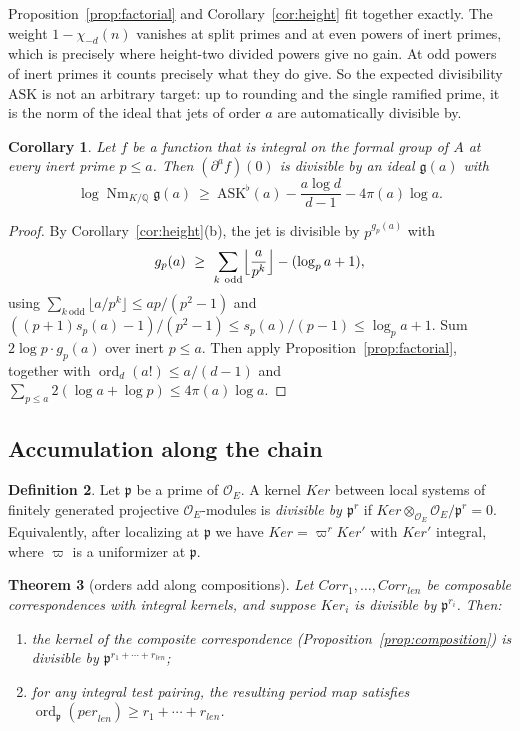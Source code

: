 \documentclass[11pt]{amsart}
\newtheorem{theorem}{Theorem}[section]
\newtheorem{corollary}[theorem]{Corollary}
\theoremstyle{definition}
\newtheorem{definition}[theorem]{Definition}
\theoremstyle{remark}
\newcommand{\OEring}{\mathcal{O}_E}
\newcommand{\per}{\mathit{per}}
\newcommand{\len}{\mathit{len}}
\newcommand{\Corr}{\mathit{Corr}}
\newcommand{\Ker}{\mathit{Ker}}
\DeclareMathOperator{\Nm}{Nm}
\DeclareMathOperator{\ord}{ord}
\newcommand{\Q}{\mathbb{Q}}
\newcommand{\pp}{\mathfrak{p}}
\newcommand{\ASK}{\mathrm{ASK}}
\begin{document}
Proposition~\ref{prop:factorial} and Corollary~\ref{cor:height} fit together exactly. The weight $1-\chi_{-d}(n)$ vanishes at split primes and at even powers of inert primes, which is precisely where height-two divided powers give no gain. At odd powers of inert primes it counts precisely what they do give. So the expected divisibility $\ASK$ is not an arbitrary target: up to rounding and the single ramified prime, it is the norm of the ideal that jets of order $a$ are automatically divisible by.

\begin{corollary}\label{cor:factorial-gain}
Let $f$ be a function that is integral on the formal group of $A$ at every inert prime $p\le a$. Then $(\partial^af)(0)$ is divisible by an ideal $\mathfrak g(a)$ with
\[
\log\Nm_{K/\Q}\mathfrak g(a)\ \ge\ \ASK^\flat(a)-\frac{a\log d}{d-1}-4\pi(a)\log a .
\]
\end{corollary}

\begin{proof}
By Corollary~\ref{cor:height}(b), the jet is divisible by $p^{g_p(a)}$ with
\[
g_p(a)\ \ge\ \sum_{k\ \mathrm{odd}}\Bigl\lfloor\frac a{p^k}\Bigr\rfloor-(\log_pa+1),
\]
using $\sum_{k\ \mathrm{odd}}\lfloor a/p^k\rfloor\le ap/(p^2-1)$ and $((p+1)s_p(a)-1)/(p^2-1)\le s_p(a)/(p-1)\le\log_pa+1$. Sum $2\log p\cdot g_p(a)$ over inert $p\le a$. Then apply Proposition~\ref{prop:factorial}, together with $\ord_d(a!)\le a/(d-1)$ and $\sum_{p\le a}2(\log a+\log p)\le4\pi(a)\log a$.
\end{proof}

\subsection{Accumulation along the chain}
\begin{definition}
Let $\pp$ be a prime of $\OEring$. A kernel $\Ker$ between local systems of finitely generated projective $\OEring$-modules is \emph{divisible by $\pp^r$} if $\Ker\otimes_{\OEring}\OEring/\pp^r=0$. Equivalently, after localizing at $\pp$ we have $\Ker=\varpi^r\Ker'$ with $\Ker'$ integral, where $\varpi$ is a uniformizer at $\pp$.
\end{definition}

\begin{theorem}[orders add along compositions]\label{thm:accumulate}
Let $\Corr_1,\dots,\Corr_\len$ be composable correspondences with integral kernels, and suppose $\Ker_i$ is divisible by $\pp^{r_i}$. Then:
\begin{enumerate}[label=(\alph*)]
\item the kernel of the composite correspondence (Proposition~\ref{prop:composition}) is divisible by $\pp^{r_1+\cdots+r_\len}$;
\item for any integral test pairing, the resulting period map satisfies $\ord_\pp(\per_\len)\ge r_1+\cdots+r_\len$.
\end{enumerate}
\end{theorem}
\end{document}
